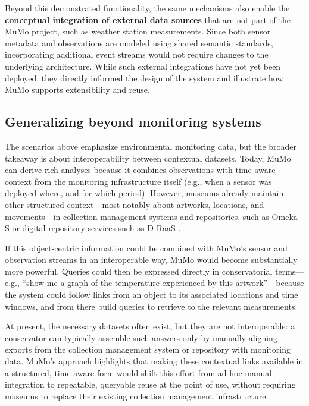 \documentclass{ceurart}
\begin{document}
Beyond this demonstrated functionality, the same mechanisms also enable
the \textbf{conceptual integration of external data sources} that are
not part of the MuMo project, such as weather station measurements.
Since both sensor metadata and observations are modeled using shared
semantic standards, incorporating additional event streams would not
require changes to the underlying architecture. While such external
integrations have not yet been deployed, they directly informed the
design of the system and illustrate how MuMo supports extensibility and
reuse.

\subsection{Generalizing beyond monitoring
systems}\label{generalizing-beyond-monitoring-systems}

The scenarios above emphasize environmental monitoring data, but the
broader takeaway is about interoperability between contextual datasets.
Today, MuMo can derive rich analyses because it combines observations
with time-aware context from the monitoring infrastructure itself (e.g.,
when a sensor was deployed where, and for which period). However,
museums already maintain other structured context---most notably about
artworks, locations, and movements---in collection management systems
and repositories, such as Omeka-S or digital repository services such as
D-RaaS \citep{draas2023}.

If this object-centric information could be combined with MuMo's sensor
and observation streams in an interoperable way, MuMo would become
substantially more powerful. Queries could then be expressed directly in
conservatorial terms---e.g., ``show me a graph of the temperature
experienced by this artwork''---because the system could follow links
from an object to its associated locations and time windows, and from
there build queries to retrieve to the relevant measurements.

At present, the necessary datasets often exist, but they are not
interoperable: a conservator can typically assemble such answers only by
manually aligning exports from the collection management system or
repository with monitoring data. MuMo's approach highlights that making
these contextual links available in a structured, time-aware form would
shift this effort from ad-hoc manual integration to repeatable,
queryable reuse at the point of use, without requiring museums to
replace their existing collection management infrastructure.
\end{document}
